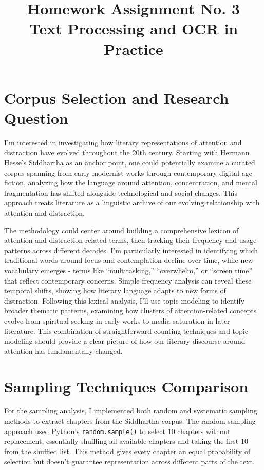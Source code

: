 \documentclass[12pt]{article}
\title{\textbf{Homework Assignment No. 3}\\
\large Text Processing and OCR in Practice}
\author{}
\date{}
\begin{document}
\maketitle

\section*{Corpus Selection and Research Question}

I'm interested in investigating how literary representations of attention and distraction have evolved throughout the 20th century. Starting with Hermann Hesse's Siddhartha as an anchor point, one could potentially examine a curated corpus spanning from early modernist works through contemporary digital-age fiction, analyzing how the language around attention, concentration, and mental fragmentation has shifted alongside technological and social changes. This approach treats literature as a linguistic archive of our evolving relationship with attention and distraction.

The methodology could center around building a comprehensive lexicon of attention and distraction-related terms, then tracking their frequency and usage patterns across different decades. I'm particularly interested in identifying which traditional words around focus and contemplation decline over time, while new vocabulary emerges - terms like ``multitasking,'' ``overwhelm,'' or ``screen time'' that reflect contemporary concerns. Simple frequency analysis can reveal these temporal shifts, showing how literary language adapts to new forms of distraction. Following this lexical analysis, I'll use topic modeling to identify broader thematic patterns, examining how clusters of attention-related concepts evolve from spiritual seeking in early works to media saturation in later literature. This combination of straightforward counting techniques and topic modeling should provide a clear picture of how our literary discourse around attention has fundamentally changed.

\section*{Sampling Techniques Comparison}

For the sampling analysis, I implemented both random and systematic sampling methods to extract chapters from the Siddhartha corpus. The random sampling approach used Python's \texttt{random.sample()} to select 10 chapters without replacement, essentially shuffling all available chapters and taking the first 10 from the shuffled list. This method gives every chapter an equal probability of selection but doesn't guarantee representation across different parts of the text.
\end{document}
